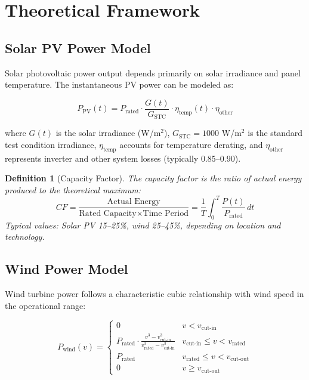 \documentclass[11pt,a4paper]{article}
\newtheorem{definition}{Definition}[section]
\begin{document}
\section{Theoretical Framework}

\subsection{Solar PV Power Model}

Solar photovoltaic power output depends primarily on solar irradiance and panel temperature.
The instantaneous PV power can be modeled as:

\begin{equation}
P_{\text{PV}}(t) = P_{\text{rated}} \cdot \frac{G(t)}{G_{\text{STC}}} \cdot \eta_{\text{temp}}(t) \cdot \eta_{\text{other}}
\end{equation}

where $G(t)$ is the solar irradiance (W/m$^2$), $G_{\text{STC}} = 1000$ W/m$^2$ is the standard
test condition irradiance, $\eta_{\text{temp}}$ accounts for temperature derating, and
$\eta_{\text{other}}$ represents inverter and other system losses (typically 0.85--0.90).

\begin{definition}[Capacity Factor]
The capacity factor is the ratio of actual energy produced to the theoretical maximum:
\begin{equation}
CF = \frac{\text{Actual Energy}}{\text{Rated Capacity} \times \text{Time Period}} = \frac{1}{T} \int_0^T \frac{P(t)}{P_{\text{rated}}} \, dt
\end{equation}
Typical values: Solar PV 15--25\%, wind 25--45\%, depending on location and technology.
\end{definition}

\subsection{Wind Power Model}

Wind turbine power follows a characteristic cubic relationship with wind speed in the operational range:

\begin{equation}
P_{\text{wind}}(v) = \begin{cases}
0 & v < v_{\text{cut-in}} \\
P_{\text{rated}} \cdot \frac{v^3 - v_{\text{cut-in}}^3}{v_{\text{rated}}^3 - v_{\text{cut-in}}^3} & v_{\text{cut-in}} \leq v < v_{\text{rated}} \\
P_{\text{rated}} & v_{\text{rated}} \leq v < v_{\text{cut-out}} \\
0 & v \geq v_{\text{cut-out}}
\end{cases}
\end{equation}
\end{document}
